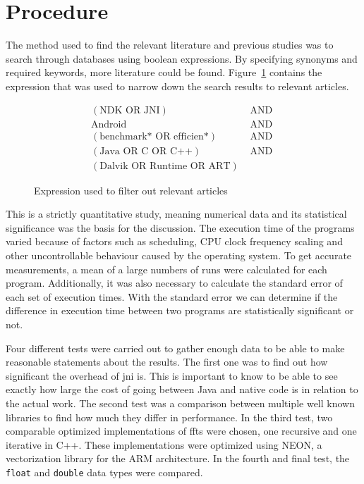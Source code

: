 \section{Procedure}

The method used to find the relevant literature and previous studies was to search through databases using boolean expressions. By specifying synonyms and required keywords, more literature could be found. Figure~\ref{fig:db:search} contains the expression that was used to narrow down the search results to relevant articles.

\ifrelease
\begin{figure}[H]
    \centering
    \begin{align*}
        (\text{NDK OR JNI})               & \text{ AND } \\
        \text{Android}                    & \text{ AND } \\
        (\text{benchmark* OR efficien*})  & \text{ AND } \\
        (\text{Java OR C OR C++})         & \text{ AND } \\
        (\text{Dalvik OR Runtime OR ART}) &
    \end{align*}
    \caption{Expression used to filter out relevant articles}
    \label{fig:db:search}
\end{figure}
\fi

This is a strictly quantitative study, meaning numerical data and its statistical significance was the basis for the discussion. The execution time of the programs varied because of factors such as scheduling, CPU clock frequency scaling and other uncontrollable behaviour caused by the operating system. To get accurate measurements, a mean of a large numbers of runs were calculated for each program. Additionally, it was also necessary to calculate the standard error of each set of execution times. With the standard error we can determine if the difference in execution time between two programs are statistically significant or not.

Four different tests were carried out to gather enough data to be able to make reasonable statements about the results. The first one was to find out how significant the overhead of \gls{jni} is. This is important to know to be able to see exactly how large the cost of going between Java and native code is in relation to the actual work. The second test was a comparison between multiple well known libraries to find how much they differ in performance. In the third test, two comparable optimized implementations of \gls{fft}s were chosen, one recursive and one iterative in C++. These implementations were optimized using NEON, a vectorization library for the ARM architecture. In the fourth and final test, the \texttt{float} and \texttt{double} data types were compared.


